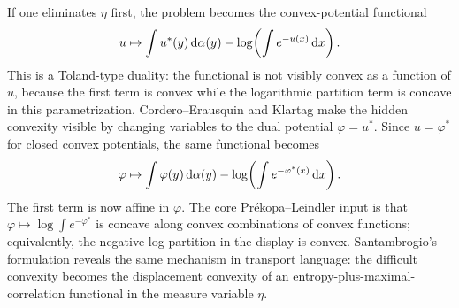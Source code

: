 \begin{rem}\label{rem-moment-hidden-convexity}
	If one eliminates $\eta$ first, the problem becomes the convex-potential functional
	\[
		u\mapsto
		\int u^*(y)\,\mathrm{d}\alpha(y)
		-
		\log\!\left(\int e^{-u(x)}\,\mathrm{d} x\right).
	\]
	This is a Toland-type duality: the functional is not visibly convex as a function of $u$, because the first term is convex while the logarithmic partition term is concave in this parametrization. Cordero--Erausquin and Klartag make the hidden convexity visible by changing variables to the dual potential $\varphi=u^*$. Since $u=\varphi^*$ for closed convex potentials, the same functional becomes
	\[
		\varphi\mapsto
		\int \varphi(y)\,\mathrm{d}\alpha(y)
		-
		\log\!\left(\int e^{-\varphi^*(x)}\,\mathrm{d} x\right).
	\]
	The first term is now affine in $\varphi$. The core Pr\'ekopa--Leindler input is that
	$\varphi\mapsto \log\int e^{-\varphi^*}$ is concave along convex combinations of convex functions; equivalently, the negative log-partition in the display is convex. Santambrogio's formulation reveals the same mechanism in transport language: the difficult convexity becomes the displacement convexity of an entropy-plus-maximal-correlation functional in the measure variable $\eta$.
\end{rem}


